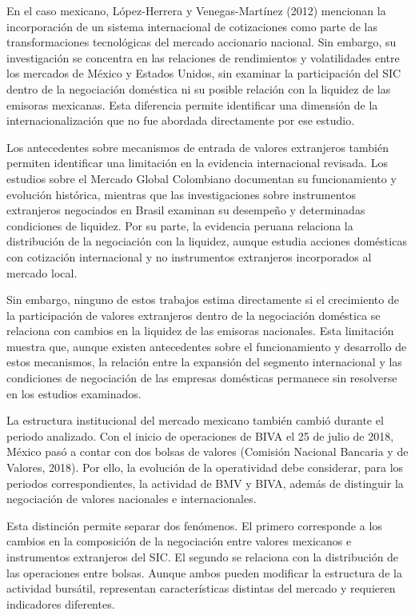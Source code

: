 En el caso mexicano, López-Herrera y Venegas-Martínez (2012) mencionan la incorporación de un sistema internacional de cotizaciones como parte de las transformaciones tecnológicas del mercado accionario nacional. Sin embargo, su investigación se concentra en las relaciones de rendimientos y volatilidades entre los mercados de México y Estados Unidos, sin examinar la participación del SIC dentro de la negociación doméstica ni su posible relación con la liquidez de las emisoras mexicanas. Esta diferencia permite identificar una dimensión de la internacionalización que no fue abordada directamente por ese estudio.

Los antecedentes sobre mecanismos de entrada de valores extranjeros también permiten identificar una limitación en la evidencia internacional revisada. Los estudios sobre el Mercado Global Colombiano documentan su funcionamiento y evolución histórica, mientras que las investigaciones sobre instrumentos extranjeros negociados en Brasil examinan su desempeño y determinadas condiciones de liquidez. Por su parte, la evidencia peruana relaciona la distribución de la negociación con la liquidez, aunque estudia acciones domésticas con cotización internacional y no instrumentos extranjeros incorporados al mercado local.

Sin embargo, ninguno de estos trabajos estima directamente si el crecimiento de la participación de valores extranjeros dentro de la negociación doméstica se relaciona con cambios en la liquidez de las emisoras nacionales. Esta limitación muestra que, aunque existen antecedentes sobre el funcionamiento y desarrollo de estos mecanismos, la relación entre la expansión del segmento internacional y las condiciones de negociación de las empresas domésticas permanece sin resolverse en los estudios examinados.

La estructura institucional del mercado mexicano también cambió durante el periodo analizado. Con el inicio de operaciones de BIVA el 25 de julio de 2018, México pasó a contar con dos bolsas de valores (Comisión Nacional Bancaria y de Valores, 2018). Por ello, la evolución de la operatividad debe considerar, para los periodos correspondientes, la actividad de BMV y BIVA, además de distinguir la negociación de valores nacionales e internacionales.

Esta distinción permite separar dos fenómenos. El primero corresponde a los cambios en la composición de la negociación entre valores mexicanos e instrumentos extranjeros del SIC. El segundo se relaciona con la distribución de las operaciones entre bolsas. Aunque ambos pueden modificar la estructura de la actividad bursátil, representan características distintas del mercado y requieren indicadores diferentes.

